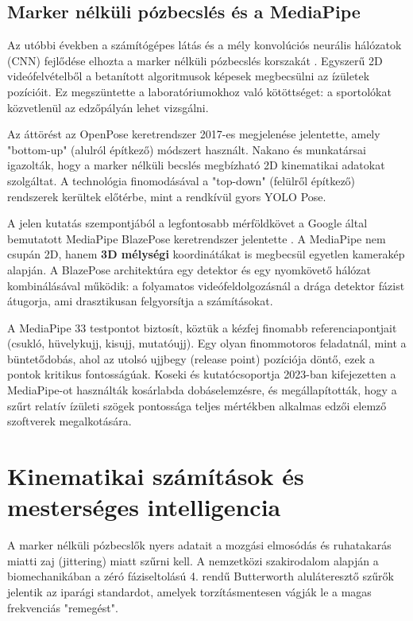 \subsection{Marker nélküli pózbecslés és a MediaPipe}
Az utóbbi években a számítógépes látás és a mély konvolúciós neurális hálózatok (CNN) fejlődése elhozta a marker nélküli pózbecslés korszakát \cite{Chen2021}. Egyszerű 2D videófelvételből a betanított algoritmusok képesek megbecsülni az ízületek pozícióit. Ez megszüntette a laboratóriumokhoz való kötöttséget: a sportolókat közvetlenül az edzőpályán lehet vizsgálni.

Az áttörést az OpenPose \cite{Cao2017} keretrendszer 2017-es megjelenése jelentette, amely "bottom-up" (alulról építkező) módszert használt. Nakano és munkatársai \cite{Nakano2020} igazolták, hogy a marker nélküli becslés megbízható 2D kinematikai adatokat szolgáltat. A technológia finomodásával a "top-down" (felülről építkező) rendszerek kerültek előtérbe, mint a rendkívül gyors YOLO Pose.

A jelen kutatás szempontjából a legfontosabb mérföldkövet a Google által bemutatott MediaPipe BlazePose keretrendszer jelentette \cite{Lugaresi2019}. A MediaPipe nem csupán 2D, hanem \textbf{3D mélységi} koordinátákat is megbecsül egyetlen kamerakép alapján. A BlazePose architektúra egy detektor és egy nyomkövető hálózat kombinálásával működik: a folyamatos videófeldolgozásnál a drága detektor fázist átugorja, ami drasztikusan felgyorsítja a számításokat.

A MediaPipe 33 testpontot biztosít, köztük a kézfej finomabb referenciapontjait (csukló, hüvelykujj, kisujj, mutatóujj). Egy olyan finommotoros feladatnál, mint a büntetődobás, ahol az utolsó ujjbegy (release point) pozíciója döntő, ezek a pontok kritikus fontosságúak. Koseki és kutatócsoportja \cite{Koseki2023} 2023-ban kifejezetten a MediaPipe-ot használták kosárlabda dobáselemzésre, és megállapították, hogy a szűrt relatív ízületi szögek pontossága teljes mértékben alkalmas edzői elemző szoftverek megalkotására.

\section{Kinematikai számítások és mesterséges intelligencia}
A marker nélküli pózbecslők nyers adatait a mozgási elmosódás és ruhatakarás miatti zaj (jittering) miatt szűrni kell. A nemzetközi szakirodalom alapján \cite{Verhoeven2021} a biomechanikában a zéró fáziseltolású 4. rendű Butterworth aluláteresztő szűrők jelentik az iparági standardot, amelyek torzításmentesen vágják le a magas frekvenciás "remegést".

